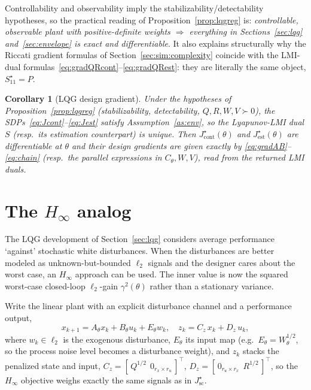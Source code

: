 \documentclass[twocolumn,amsthm]{autart}
\newtheorem{corollary}{Corollary}
\begin{document}
Controllability and observability imply the stabilizability/detectability
hypotheses, so the practical reading of Proposition~\ref{prop:lqgreg} is:
\emph{controllable, observable plant with positive-definite weights $\Rightarrow$
everything in Sections~\ref{sec:lqg} and~\ref{sec:envelope} is exact and
differentiable}. It also explains structurally why the Riccati gradient formulas
of Section~\ref{sec:sim:complexity} coincide with the LMI-dual
formulas~\eqref{eq:gradQRcont}--\eqref{eq:gradQRest}: they are literally the same
object, $S_{11}^\star=P$.

\begin{corollary}[LQG design gradient]\label{cor:lqg}
Under the hypotheses of Proposition~\ref{prop:lqgreg} (stabilizability,
detectability, $Q,R,W,V\succ0$), the SDPs~\eqref{eq:Jcont}--\eqref{eq:Jest}
satisfy Assumption~\ref{as:env}, so the Lyapunov-LMI dual $S$ (resp.\ its
estimation counterpart) is unique. Then $J_{\mathrm{cont}}^\star(\theta)$ and
$J_{\mathrm{est}}^\star(\theta)$ are differentiable at $\theta$ and their design
gradients are given exactly by \eqref{eq:gradAB}--\eqref{eq:chain} (resp.\ the
parallel expressions in $C_\theta, W, V$), read from the returned LMI duals.
\end{corollary}


\section{The $H_\infty$ analog}\label{sec:hinf}

The LQG development of Section~\ref{sec:lqg} considers average performance
`against' stochastic white disturbances. When the disturbances are better modeled as
unknown-but-bounded $\ell_2$ signals and the designer cares about the
worst case, an $H_\infty$ approach can be used. The inner value is now the
squared worst-case closed-loop $\ell_2$-gain $\gamma^2(\theta)$ rather than a
stationary variance.

Write the linear plant with an explicit disturbance channel and a performance
output,
\begin{equation}\label{eq:hinf_plant}
x_{k+1} = A_\theta x_k + B_\theta u_k + E_\theta w_k,\quad
z_k = C_{z}\,x_k + D_{z}\,u_k,
\end{equation}
where $w_k\in\ell_2$ is the exogenous disturbance, $E_\theta$ its input map
(e.g.\ $E_\theta = W_\theta^{1/2}$, so the process noise level becomes a disturbance weight), and $z_k$ stacks the penalized
state and input, $C_z = [\,Q^{1/2}\;\,0_{r_x \times r_u}\,]^\top$, $D_z = [\,0_{r_u \times r_x}\;\,R^{1/2}\,]^\top$, so the
$H_\infty$ objective weighs exactly the same signals as in $J_{\mathrm{sc}}^\star$.
\end{document}
